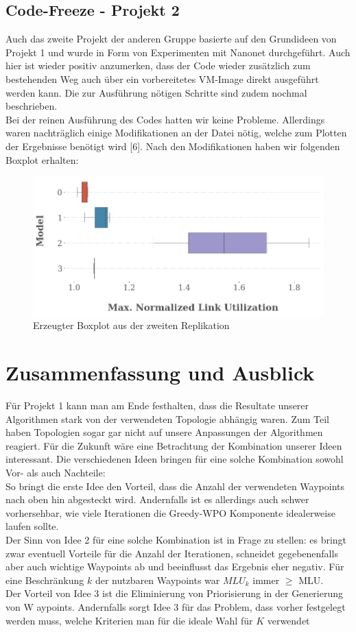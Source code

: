 \documentclass[sigconf,noacm,review]{acmart}
\begin{document}
\subsection{Code-Freeze - Projekt 2}
Auch das zweite Projekt der anderen Gruppe basierte auf den Grundideen von Projekt 1 und wurde in Form von Experimenten mit Nanonet durchgeführt. Auch hier ist wieder positiv anzumerken, dass der Code wieder zusätzlich zum bestehenden Weg auch über ein vorbereitetes VM-Image direkt ausgeführt werden kann. Die zur Ausführung nötigen Schritte sind zudem nochmal beschrieben. \\
Bei der reinen Ausführung des Codes hatten wir keine Probleme. Allerdings waren nachträglich einige Modifikationen an der Datei nötig, welche zum Plotten der Ergebnisse benötigt wird [6]. Nach den Modifikationen haben wir folgenden Boxplot erhalten:
\begin{figure}[h]
  \centering
  \includegraphics[width=\linewidth]{abbildungen/boxplot}
  \caption{Erzeugter Boxplot aus der zweiten Replikation}
\end{figure}

\section{Zusammenfassung und Ausblick}
Für Projekt 1 kann man am Ende festhalten, dass die Resultate unserer Algorithmen stark von der verwendeten Topologie abhängig waren. Zum Teil haben Topologien sogar gar nicht auf unsere Anpassungen der Algorithmen reagiert.
Für die Zukunft wäre eine Betrachtung der Kombination unserer Ideen interessant. Die verschiedenen Ideen bringen für eine solche Kombination sowohl Vor- als auch Nachteile: \\
So bringt die erste Idee den Vorteil, dass die Anzahl der verwendeten Waypoints nach oben hin abgesteckt wird. Andernfalls ist es allerdings auch schwer vorhersehbar, wie viele Iterationen die Greedy-WPO Komponente idealerweise laufen sollte. \\
Der Sinn von Idee 2 für eine solche Kombination ist in Frage zu stellen: es bringt zwar eventuell Vorteile für die Anzahl der Iterationen, schneidet gegebenenfalls aber auch wichtige Waypoints ab und beeinflusst das Ergebnis eher negativ. Für eine Beschränkung $k$ der nutzbaren Waypoints war $MLU_{k}$ immer $\geq$ MLU. \\
Der Vorteil von Idee 3 ist die Eliminierung von Priorisierung in der Generierung von W aypoints. Andernfalls sorgt Idee 3 für das Problem, dass vorher festgelegt werden muss, welche Kriterien man für die ideale Wahl für $K$ verwendet
\end{document}
